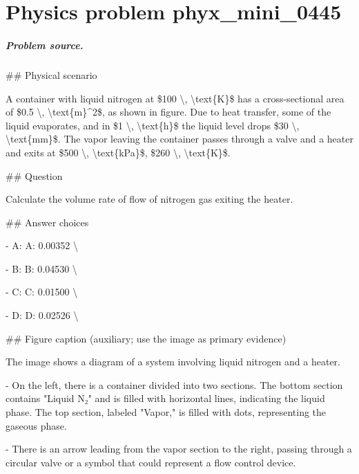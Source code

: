 
\chapter{Physics problem phyx\_mini\_0445}
\label{ch:PhyXMiniProblems_problem_phyx_mini_0445}

\paragraph{Problem source.}
\#\# Physical scenario

A container with liquid nitrogen at \$100 \textbackslash{}, \textbackslash{}text\{K\}\$ has a cross-sectional area of \$0.5 \textbackslash{}, \textbackslash{}text\{m\}\textasciicircum{}2\$, as shown in figure. Due to heat transfer, some of the liquid evaporates, and in \$1 \textbackslash{}, \textbackslash{}text\{h\}\$ the liquid level drops \$30 \textbackslash{}, \textbackslash{}text\{mm\}\$. The vapor leaving the container passes through a valve and a heater and exits at \$500 \textbackslash{}, \textbackslash{}text\{kPa\}\$, \$260 \textbackslash{}, \textbackslash{}text\{K\}\$.

\#\# Question

Calculate the volume rate of flow of nitrogen gas exiting the heater.

\#\# Answer choices

- A: A: 0.00352 \textbackslash{}

- B: B: 0.04530 \textbackslash{}

- C: C: 0.01500 \textbackslash{}

- D: D: 0.02526 \textbackslash{}

\#\# Figure caption (auxiliary; use the image as primary evidence)

The image shows a diagram of a system involving liquid nitrogen and a heater. 

- On the left, there is a container divided into two sections. The bottom section contains "Liquid N₂" and is filled with horizontal lines, indicating the liquid phase. The top section, labeled "Vapor," is filled with dots, representing the gaseous phase.

- There is an arrow leading from the vapor section to the right, passing through a circular valve or a symbol that could represent a flow control device.

